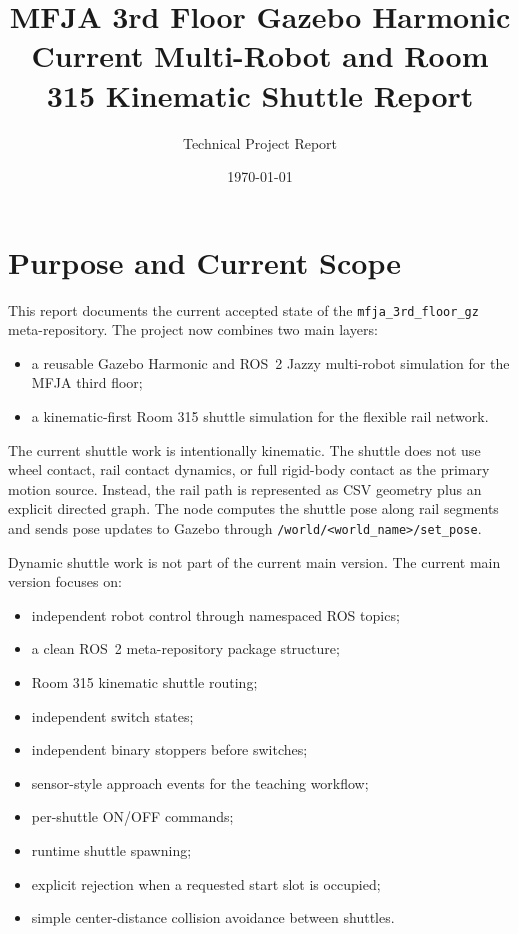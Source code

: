 \documentclass[12pt,a4paper]{report}
\title{MFJA 3rd Floor Gazebo Harmonic\\Current Multi-Robot and Room 315 Kinematic Shuttle Report}
\author{Technical Project Report}
\date{\today}
\begin{document}
\maketitle
\tableofcontents
\clearpage

\chapter{Purpose and Current Scope}

This report documents the current accepted state of the
\texttt{mfja\_3rd\_floor\_gz} meta-repository. The project now combines two
main layers:

\begin{itemize}
\item a reusable Gazebo Harmonic and ROS~2 Jazzy multi-robot simulation for the
MFJA third floor;
\item a kinematic-first Room 315 shuttle simulation for the flexible rail
network.
\end{itemize}

The current shuttle work is intentionally kinematic. The shuttle does not use
wheel contact, rail contact dynamics, or full rigid-body contact as the primary
motion source. Instead, the rail path is represented as CSV geometry plus an
explicit directed graph. The node computes the shuttle pose along rail segments
and sends pose updates to Gazebo through
\texttt{/world/<world\_name>/set\_pose}.

Dynamic shuttle work is not part of the current main version. The current main
version focuses on:

\begin{itemize}
\item independent robot control through namespaced ROS topics;
\item a clean ROS~2 meta-repository package structure;
\item Room 315 kinematic shuttle routing;
\item independent switch states;
\item independent binary stoppers before switches;
\item sensor-style approach events for the teaching workflow;
\item per-shuttle ON/OFF commands;
\item runtime shuttle spawning;
\item explicit rejection when a requested start slot is occupied;
\item simple center-distance collision avoidance between shuttles.
\end{itemize}
\end{document}
